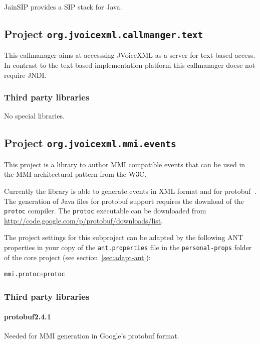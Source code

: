 \documentclass[11pt,a4paper]{article}
\begin{document}
JainSIP provides a SIP stack for Java.

\subsection{Project \texttt{org.jvoicexml.callmanger.text}}

This callmanager aims at accesssing JVoiceXML as a server for text based
access. In contrast to the text based implementation platform this callmanager
doese not require JNDI.

\subsubsection{Third party libraries}

No special libraries.


\subsection{Project \texttt{org.jvoicexml.mmi.events}}
\label{sec:mmi-events}

This project is a library to author MMI compatible events that can be used in
the MMI architectural pattern from the W3C.

Currently the library is able to generate events in XML format and for
protobuf~\cite{google:protobuf}. The generation of Java files for protobuf
support requires the download of the \texttt{protoc} compiler. The \texttt{protoc}
executable can be downloaded from \url{http://code.google.com/p/protobuf/downloads/list}.

The project settings for this subproject can be adapted by the following ANT
properties in your copy of the \texttt{ant.properties} file in the
\texttt{personal-props} folder of the core project (see 
section~\ref{sec:adapt-ant}):
\begin{lstlisting}
mmi.protoc=protoc
\end{lstlisting}

\subsubsection{Third party libraries}

\paragraph{protobuf2.4.1}

Needed for MMI generation in Google's protobuf format.
\end{document}
